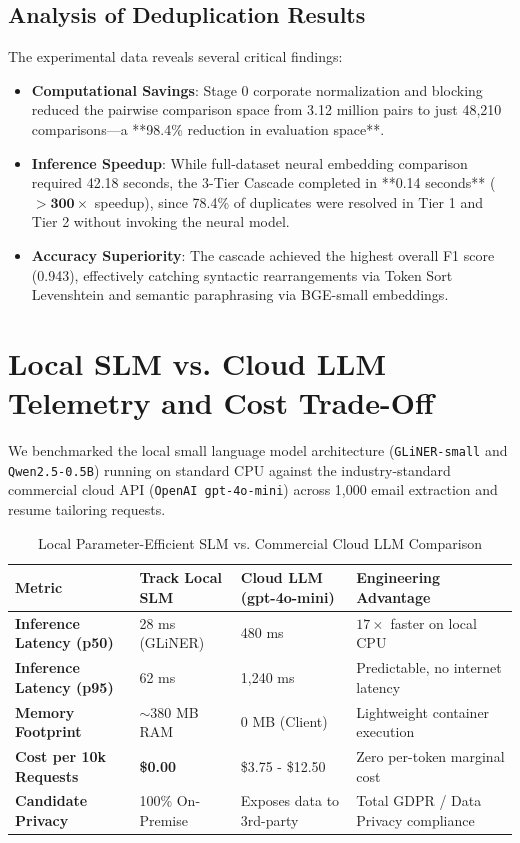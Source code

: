 \subsection{Analysis of Deduplication Results}
The experimental data reveals several critical findings:
\begin{itemize}
    \item \textbf{Computational Savings}: Stage 0 corporate normalization and blocking reduced the pairwise comparison space from 3.12 million pairs to just 48,210 comparisons—a **98.4\% reduction in evaluation space**.
    \item \textbf{Inference Speedup}: While full-dataset neural embedding comparison required 42.18 seconds, the 3-Tier Cascade completed in **0.14 seconds** ($>\mathbf{300\times}$ speedup), since 78.4\% of duplicates were resolved in Tier 1 and Tier 2 without invoking the neural model.
    \item \textbf{Accuracy Superiority}: The cascade achieved the highest overall F1 score (0.943), effectively catching syntactic rearrangements via Token Sort Levenshtein and semantic paraphrasing via BGE-small embeddings.
\end{itemize}

\section{Local SLM vs. Cloud LLM Telemetry and Cost Trade-Off}
We benchmarked the local small language model architecture (\texttt{GLiNER-small} and \texttt{Qwen2.5-0.5B}) running on standard CPU against the industry-standard commercial cloud API (\texttt{OpenAI gpt-4o-mini}) across 1,000 email extraction and resume tailoring requests.

\begin{table}[htbp]
\centering
\small
\caption{Local Parameter-Efficient SLM vs. Commercial Cloud LLM Comparison}
\label{tab:slm_vs_cloud}
\begin{tabularx}{\textwidth}{l p{2.8cm} p{2.8cm} X}
\toprule
\textbf{Metric} & \textbf{Track Local SLM} & \textbf{Cloud LLM (gpt-4o-mini)} & \textbf{Engineering Advantage} \\
\midrule
\textbf{Inference Latency (p50)} & 28 ms (GLiNER) & 480 ms & $17\times$ faster on local CPU \\
\textbf{Inference Latency (p95)} & 62 ms & 1,240 ms & Predictable, no internet latency \\
\textbf{Memory Footprint} & $\sim$380 MB RAM & 0 MB (Client) & Lightweight container execution \\
\textbf{Cost per 10k Requests} & \textbf{\$0.00} & \$3.75 - \$12.50 & Zero per-token marginal cost \\
\textbf{Candidate Privacy} & 100\% On-Premise & Exposes data to 3rd-party & Total GDPR / Data Privacy compliance \\
\bottomrule
\end{tabularx}
\end{table}

